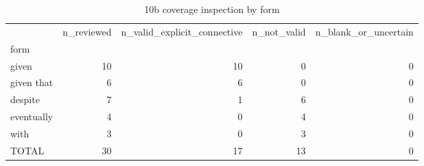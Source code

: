 \begin{table}
\caption{10b coverage inspection by form}
\begin{tabular}{lrrrr}
\toprule
 & n\_reviewed & n\_valid\_explicit\_connective & n\_not\_valid & n\_blank\_or\_uncertain \\
form &  &  &  &  \\
\midrule
given & 10 & 10 & 0 & 0 \\
given that & 6 & 6 & 0 & 0 \\
despite & 7 & 1 & 6 & 0 \\
eventually & 4 & 0 & 4 & 0 \\
with & 3 & 0 & 3 & 0 \\
TOTAL & 30 & 17 & 13 & 0 \\
\bottomrule
\end{tabular}
\end{table}
